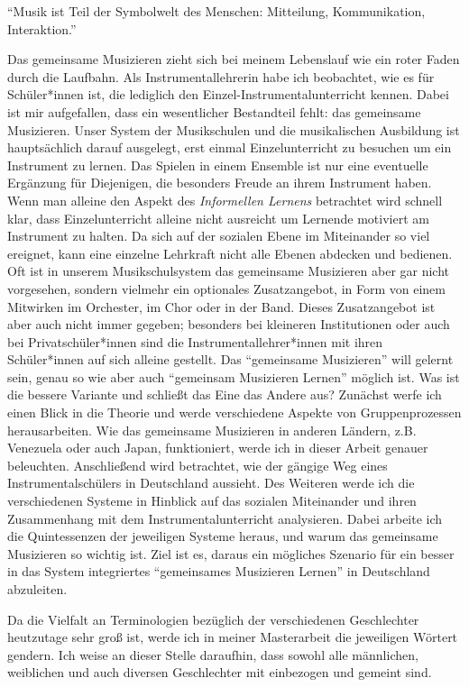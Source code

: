 
\enquote{Musik ist Teil der Symbolwelt des Menschen: Mitteilung, Kommunikation,
Interaktion.} \autocite[91]{doerne:umfassend_musizieren}

Das gemeinsame Musizieren zieht sich bei meinem Lebenslauf wie ein roter Faden
durch die Laufbahn. Als Instrumentallehrerin habe ich beobachtet, wie es für
Schüler*innen ist, die lediglich den Einzel-Instrumentalunterricht kennen. Dabei
ist mir aufgefallen, dass ein wesentlicher Bestandteil fehlt: das gemeinsame
Musizieren. Unser System der Musikschulen und die musikalischen Ausbildung ist
hauptsächlich darauf ausgelegt, erst einmal Einzelunterricht zu besuchen um ein
Instrument zu lernen. Das Spielen in einem Ensemble ist nur eine eventuelle
Ergänzung für Diejenigen, die besonders Freude an ihrem Instrument haben. Wenn
man alleine den Aspekt des
\emph{Informellen Lernens}
betrachtet wird schnell klar, dass Einzelunterricht alleine nicht ausreicht um
Lernende motiviert am Instrument zu halten. Da sich auf der sozialen Ebene im
Miteinander so viel ereignet, kann eine einzelne Lehrkraft nicht alle Ebenen
abdecken und bedienen. Oft ist in unserem Musikschulsystem das gemeinsame
Musizieren aber gar nicht vorgesehen, sondern vielmehr ein optionales
Zusatzangebot, in Form von einem Mitwirken im Orchester, im Chor oder in der
Band. Dieses Zusatzangebot ist aber auch nicht immer gegeben; besonders bei
kleineren Institutionen oder auch bei Privatschüler*innen sind die
Instrumentallehrer*innen mit ihren Schüler*innen auf sich alleine gestellt. Das
\enquote{gemeinsame Musizieren} will gelernt sein, genau so wie aber auch
\enquote{gemeinsam Musizieren Lernen} möglich ist. Was ist die bessere Variante und
schließt das Eine das Andere aus? Zunächst werfe ich einen Blick in die Theorie
und werde verschiedene Aspekte von Gruppenprozessen herausarbeiten. Wie das
gemeinsame Musizieren in anderen Ländern, z.B. Venezuela oder auch Japan,
funktioniert, werde ich in dieser Arbeit genauer beleuchten. Anschließend wird
betrachtet, wie der gängige Weg eines Instrumentalschülers in Deutschland
aussieht. Des Weiteren werde ich die verschiedenen Systeme in Hinblick auf das
sozialen Miteinander und ihren Zusammenhang mit dem Instrumentalunterricht
analysieren. Dabei arbeite ich die Quintessenzen der jeweiligen Systeme heraus,
und warum das gemeinsame Musizieren so wichtig ist. Ziel ist es, daraus ein
mögliches Szenario für ein besser in das System integriertes
\enquote{gemeinsames Musizieren Lernen} in Deutschland abzuleiten.


Da die Vielfalt an Terminologien bezüglich der verschiedenen Geschlechter
heutzutage sehr groß ist, werde ich in meiner Masterarbeit die jeweiligen
Wörtert gendern. Ich weise an dieser Stelle daraufhin, dass sowohl alle
männlichen, weiblichen und auch diversen Geschlechter mit einbezogen und gemeint
sind. 
